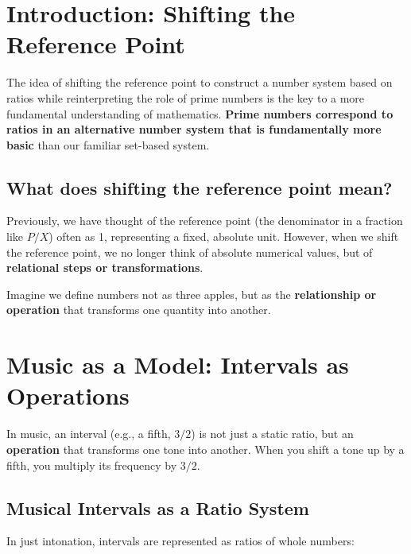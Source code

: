 	
	
	\section{Introduction: Shifting the Reference Point}
	
	The idea of shifting the reference point to construct a number system based on ratios while reinterpreting the role of prime numbers is the key to a more fundamental understanding of mathematics. \textbf{Prime numbers correspond to ratios in an alternative number system that is fundamentally more basic} than our familiar set-based system.
	
	\subsection{What does shifting the reference point mean?}
	
	Previously, we have thought of the reference point (the denominator in a fraction like $P/X$) often as 1, representing a fixed, absolute unit. However, when we shift the reference point, we no longer think of absolute numerical values, but of \textbf{relational steps or transformations}.
	
	Imagine we define numbers not as three apples, but as the \textbf{relationship or operation} that transforms one quantity into another.
	
	\section{Music as a Model: Intervals as Operations}
	
	In music, an interval (e.g., a fifth, $3/2$) is not just a static ratio, but an \textbf{operation} that transforms one tone into another. When you shift a tone up by a fifth, you multiply its frequency by $3/2$.
	
	\subsection{Musical Intervals as a Ratio System}
	
	In just intonation, intervals are represented as ratios of whole numbers:
	
